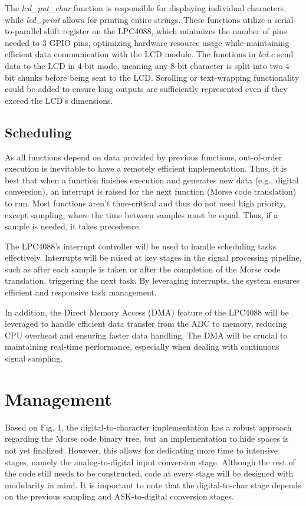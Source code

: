 \documentclass{cce2014-design}
\begin{document}
The \textit{lcd\_put\_char} function is responsible for displaying individual characters, while \textit{lcd\_print} allows for printing entire strings. These functions utilize a serial-to-parallel shift register on the LPC4088, which minimizes the number of pins needed to 3 GPIO pins, optimizing hardware resource usage while maintaining efficient data communication with the LCD module. The functions in \textit{lcd.c} send data to the LCD in 4-bit mode, meaning any 8-bit character is split into two 4-bit chunks before being sent to the LCD. Scrolling or text-wrapping functionality could be added to ensure long outputs are sufficiently represented even if they exceed the LCD's dimensions.

\subsection{Scheduling}
As all functions depend on data provided by previous functions, out-of-order execution is inevitable to have a remotely efficient implementation. Thus, it is best that when a function finishes execution and generates new data (e.g., digital conversion), an interrupt is raised for the next function (Morse code translation) to run. Most functions aren’t time-critical and thus do not need high priority, except sampling, where the time between samples must be equal. Thus, if a sample is needed, it takes precedence.

The LPC4088’s interrupt controller will be used to handle scheduling tasks effectively. Interrupts will be raised at key stages in the signal processing pipeline, such as after each sample is taken or after the completion of the Morse code translation, triggering the next task. By leveraging interrupts, the system ensures efficient and responsive task management.

In addition, the Direct Memory Access (DMA) feature of the LPC4088 will be leveraged to handle efficient data transfer from the ADC to memory, reducing CPU overhead and ensuring faster data handling. The DMA will be crucial to maintaining real-time performance, especially when dealing with continuous signal sampling.

\section{Management}
Based on Fig. 1, the digital-to-character implementation has a robust approach regarding the Morse code binary tree, but an implementation to hide spaces is not yet finalized. However, this allows for dedicating more time to intensive stages, namely the analog-to-digital input conversion stage. Although the rest of the code still needs to be constructed, code at every stage will be designed with modularity in mind. It is important to note that the digital-to-char stage depends on the previous sampling and ASK-to-digital conversion stages.
\end{document}
